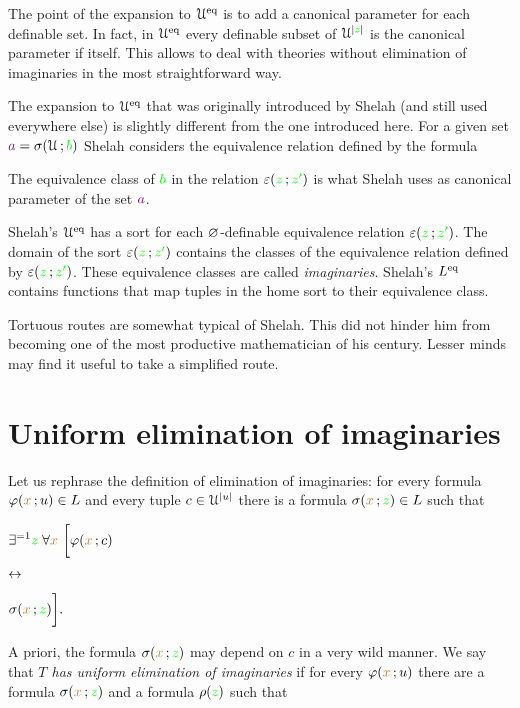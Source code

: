 \documentclass[creche.tex]{subfiles}
\begin{document}
The point of the expansion to $\EuScript U^{{\rm eq}}$ is to add a canonical parameter for each definable set. In fact, in $\EuScript U^{{\rm eq}}$ every definable subset of $\EuScript U^{|{\color{green} z}|}$ is the canonical parameter if itself. This allows to deal with theories without elimination of imaginaries in the most straightforward way.

The expansion to $\EuScript U^{{\rm eq}}$ that was originally introduced by Shelah (and still used everywhere else) is slightly different from the one introduced here. For a given set ${\color{violet} a}=\sigma(\EuScript U\,;{\color{green} b})$ Shelah considers the equivalence relation defined by the formula


The equivalence class of ${\color{green} b}$ in the relation $\varepsilon({\color{green} z}\,;{\color{green} z'})$ is what Shelah uses as canonical parameter of the set ${\color{violet} a}$. 

Shelah's $\EuScript U^{{\rm eq}}$ has a sort for each $\varnothing$-definable equivalence relation $\varepsilon({\color{green} z}\,;{\color{green} z'})$. The domain of the sort $\varepsilon({\color{green} z}\,;{\color{green} z'})$ contains the classes of the equivalence relation defined by $\varepsilon({\color{green} z}\,;{\color{green} z'})$. These equivalence classes are called \emph{imaginaries}. Shelah's $L^{{\rm eq}}$ contains functions that map tuples in the home sort to their equivalence class.

Tortuous routes are somewhat typical of Shelah. This did not hinder him from becoming one of the most productive mathematician of his century. Lesser minds may find it useful to take a simplified route.


\section{Uniform elimination of imaginaries}

\def\medrel#1{\parbox[t]{5ex}{$\displaystyle\hfil #1$}}
\def\ceq#1#2#3{\parbox[t]{35ex}{$\displaystyle #1$}\medrel{#2}{$\displaystyle #3$}}


Let us rephrase the definition of elimination of imaginaries: for every formula $\varphi({\color{brown} x}\,;u)\in L$ and every tuple $c\in\EuScript U^{|u|}$ there is a formula $\sigma({\color{brown} x}\,;{\color{green} z})\in L$ such that

\ceq{\hfill\E^{=1} {\gr z}\;\A {\mr x}\ \bigg[\phi({\mr x}\,;c)}{\iff}{\sigma({\mr x}\,;{\gr z})\bigg].}

A priori, the formula $\sigma({\color{brown} x}\,;{\color{green} z})$ may depend on $c$ in a very wild manner. We say that \emph{$T$ has uniform elimination of imaginaries\/} if for every $\varphi({\color{brown} x}\,;u)$ there are a formula $\sigma({\color{brown} x}\,;{\color{green} z})$ and a formula $\rho({\color{green} z})$ such that 
\end{document}
